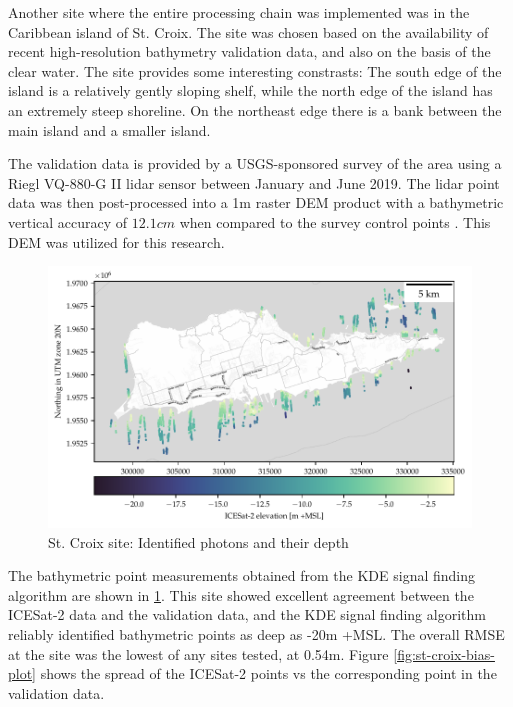Another site where the entire processing chain was implemented was in the Caribbean island of St. Croix. The site was chosen based on the availability of recent high-resolution bathymetry validation data, and also on the basis of the clear water. The site provides some interesting constrasts: The south edge of the island is a relatively gently sloping shelf, while the north edge of the island has an extremely steep shoreline. On the northeast edge there is a bank between the main island and a smaller island.

The validation data is provided by a USGS-sponsored survey of the area using a Riegl VQ-880-G II lidar sensor between January and June 2019. The lidar point data was then post-processed into a 1m raster DEM product with a bathymetric vertical accuracy of $12.1 cm$ when compared to the survey control points \parencite{}. This DEM was utilized for this research.


\begin{figure}[htbp]
    \centering
    \includegraphics{figures/stcroix_photon_map.pdf}
    \caption{St. Croix site: Identified photons and their depth}
    \label{fig:st-croix-photons}
\end{figure}

The bathymetric point measurements obtained from the KDE signal finding algorithm are shown in \ref{fig:st-croix-photons}. This site showed excellent agreement between the ICESat-2 data and the validation data, and the KDE signal finding algorithm reliably identified bathymetric points as deep as -20m +MSL. The overall RMSE at the site was the lowest of any sites tested, at 0.54m. Figure \ref{fig:st-croix-bias-plot} shows the spread of the ICESat-2 points vs the corresponding point in the validation data.


